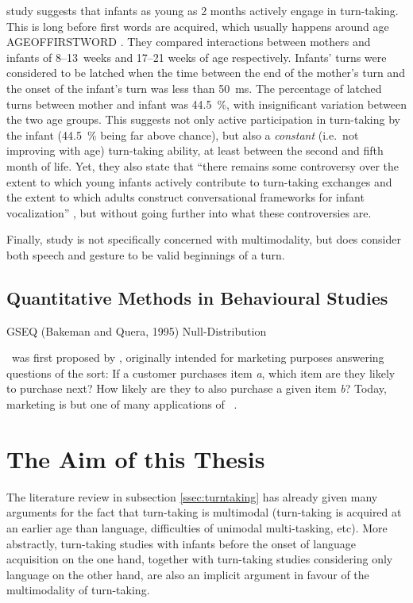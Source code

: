  study suggests that infants as young as 2 months actively engage in turn-taking. This is long before first words are acquired, which usually happens around age AGEOFFIRSTWORD \citep{nosource}.  They compared interactions between mothers and infants of 8--13~weeks and 17--21 weeks of age respectively. Infants' turns were considered to be latched when the time between the end of the mother's turn and the onset of the infant's turn was less than 50~ms. The percentage of latched turns between mother and infant was 44.5~\%, with insignificant variation between the two age groups. This suggests not only active participation in turn-taking by the infant (44.5~\% being far above chance), but also a \emph{constant} (i.e.\ not improving with age) turn-taking ability, at least between the second and fifth month of life.
Yet, they also state that ``there remains some controversy over the extent to which young infants actively contribute to turn-taking exchanges and the extent to which adults construct conversational frameworks for infant vocalization'' \citep[]{gratier15}, but without going further into what these controversies are.

Finally,  study is not specifically concerned with multimodality, but does consider both speech and gesture to be valid beginnings of a turn.

\subsection{Quantitative Methods in Behavioural Studies}
\label{ssec:introductionresearchquantitative}
GSEQ (Bakeman and Quera, 1995)
Null-Distribution \citep{abuzhaya17}


\fpmsentence\ was first proposed by \citet{agrawal93}, originally intended for marketing purposes answering questions of the sort: If a customer purchases item \emph{a}, which item are they likely to purchase next? How likely are they to also purchase a given item \emph{b}? Today, marketing is but one of many applications of \fpmlower\ \citep[]{han07}.


\section{The Aim of this Thesis}
\label{sec:introductionaim}
The literature review in subsection \ref{ssec:turntaking} has already given many arguments for the fact that turn-taking is multimodal (turn-taking is acquired at an earlier age than language, difficulties of unimodal multi-tasking, etc). %
More abstractly, turn-taking studies with infants before the onset of language acquisition on the one hand, together with turn-taking studies considering only language on the other hand, are also an implicit argument in favour of the multimodality of turn-taking.

